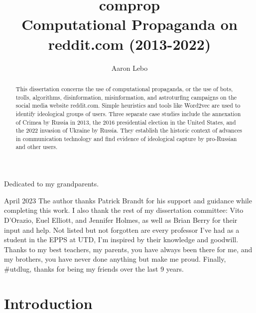 \documentclass[doublespacing]{utdthesis}
\author{Aaron Lebo}
\title{comprop \\ Computational Propaganda on reddit.com (2013-2022)}
\begin{document}
\frontmatter

\signaturepage


\begin{dedication} %
Dedicated to my grandparents.
\end{dedication}

\maketitle

\begin{acks}{April 2023} %
The author thanks Patrick Brandt for his support and guidance while completing this work.
I also thank the rest of my dissertation committee: Vito D'Orazio, Euel Elliott, and Jennifer Holmes, as well as Brian Berry for their input and help.
Not listed but not forgotten are every professor I've had as a student in the EPPS at UTD, I'm inspired by their knowledge and goodwill.
Thanks to my best teachers, my parents, you have always been there for me, and my brothers, you have never done anything but make me proud.
Finally, \#utdlug, thanks for being my friends over the last 9 years.
\end{acks}

\begin{abstract}
This dissertation concerns the use of computational propaganda, or the use of bots, trolls, algorithms, disinformation, misinformation, and astroturfing campaigns on the social media website reddit.com.
Simple heuristics and tools like Word2vec are used to identify ideological groups of users.
Three separate case studies include the annexation of Crimea by Russia in 2013, the 2016 presidential election in the United States, and the 2022 invasion of Ukraine by Russia.
They establish the historic context of advances in communication technology and find evidence of ideological capture by pro-Russian and other users.
\end{abstract}

\tableofcontents
\listoffigures %
\listoftables %

\mainmatter

\chapter{Introduction}
\label{c:intro}
\end{document}
